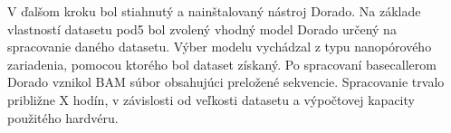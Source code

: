 V ďalšom kroku bol stiahnutý a nainštalovaný nástroj Dorado. Na základe vlastností datasetu pod5 bol zvolený vhodný model Dorado určený na spracovanie daného datasetu.
Výber modelu vychádzal z typu nanopórového zariadenia, pomocou ktorého bol dataset získaný.
Po spracovaní basecallerom Dorado vznikol BAM súbor obsahujúci preložené sekvencie.
Spracovanie trvalo približne X hodín, v závislosti od veľkosti datasetu a výpočtovej kapacity použitého hardvéru. %
